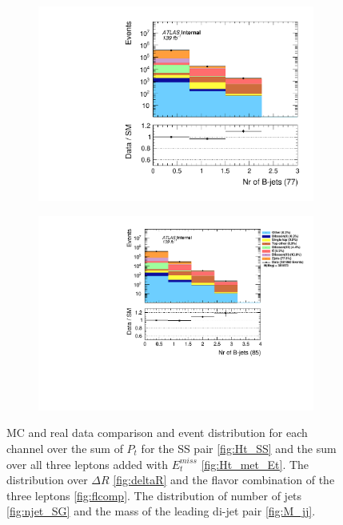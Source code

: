\begin{figure}[H]
{\begin{subfigure}{.405\textwidth}
        \includegraphics[width=\textwidth]{Figures/FeaturesHistograms/MCvsData/nbjet77.pdf}
        \caption{}
        \label{fig:nbjet77}
    \end{subfigure}
    \hfill
    \begin{subfigure}{.525\textwidth}
        \includegraphics[width=\textwidth]{Figures/FeaturesHistograms/MCvsData/nbjet85.pdf}
        \caption{}
        \label{fig:nbjet85}
    \end{subfigure}
    }
    \caption{\ac{MC} and real data comparison and event distribution for each channel over the sum of $P_t$
    for the SS pair \ref{fig:Ht_SS} and the sum over all three leptons added with $E_t^{miss}$
    \ref{fig:Ht_met_Et}. The distribution over $\Delta R$ \ref{fig:deltaR} and the flavor 
    combination of the three leptons \ref{fig:flcomp}. The distribution of number of jets 
    \ref{fig:njet_SG} and the mass of the leading di-jet pair \ref{fig:M_jj}.}
\end{figure}
